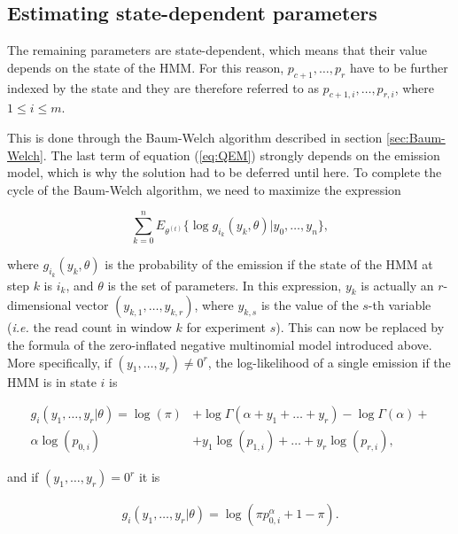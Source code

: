 \documentclass[12pt]{article}
\begin{document}
\subsection{Estimating state-dependent parameters}

    The remaining parameters are state-dependent, which means that
    their value depends on the state of the HMM. For this reason,
    $p_{c+1}, \ldots, p_r$ have to be further indexed by the state
    and they are therefore referred to as
    $p_{c+1,i}, \ldots, p_{r,i}$, where $1 \leq i \leq m$.

    This is done through the Baum-Welch algorithm described in
    section \ref{sec:Baum-Welch}. The last term of equation
    (\ref{eq:QEM}) strongly depends on the emission model, which
    is why the solution had to be deferred until here. To complete
    the cycle of the Baum-Welch algorithm, we need to maximize
    the expression

    \begin{equation*}
      \sum_{k=0}^n E_{\theta^{(t)}} \Big\{
      \log g_{i_k}(y_k, \theta) \Big| y_0, \ldots, y_n \Big\},
    \end{equation*}

    \noindent
    where $g_{i_k}(y_k, \theta)$ is the probability of the emission
    if the state of the HMM at step $k$ is $i_k$, and $\theta$ is
    the set of parameters. In this expression, $y_k$ is actually
    an $r$-dimensional vector $(y_{k,1}, \ldots, y_{k,r})$, where
    $y_{k,s}$ is the value of the $s$-th variable (\textit{i.e.}
    the read count in window $k$ for experiment $s$).
    This can now be replaced by the formula
    of the zero-inflated negative multinomial model introduced above.
    More specifically, if $(y_1, \ldots, y_r) \neq 0^r$, the
    log-likelihood of a single emission if the HMM is in state $i$ is

    \begin{align*}
      g_i(y_1, \ldots, y_r|\theta) =
      \log(\pi) &+ \log\Gamma(\alpha+y_1+\ldots+y_r) -
      \log\Gamma(\alpha) + \\
      \alpha\log(p_{0,i}) &+ y_1 \log(p_{1,i}) + \ldots +
      y_r \log(p_{r,i}),
    \end{align*}

    \noindent
    and if $(y_1, \ldots, y_r) = 0^r$ it is

    \begin{align*}
      g_i(y_1, \ldots, y_r|\theta) = \log(\pi p_{0,i}^{\alpha}+1-\pi).
    \end{align*}
\end{document}
